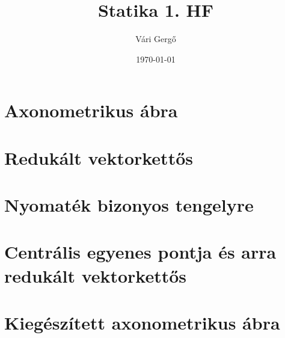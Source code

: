 \documentclass{article}
\title{Statika 1. HF}
\author{Vári Gergő}
\date{\today}
\begin{document}
\maketitle

\section{Axonometrikus ábra}


\break

\section{Redukált vektorkettős}


\section{Nyomaték bizonyos tengelyre}


\section{Centrális egyenes pontja és arra redukált vektorkettős}


\section{Kiegészített axonometrikus ábra}

\end{document}
